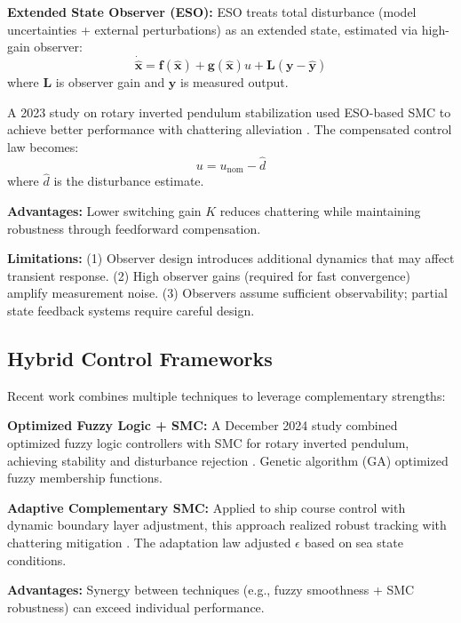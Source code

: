 \textbf{Extended State Observer (ESO):} ESO treats total disturbance (model uncertainties + external perturbations) as an extended state, estimated via high-gain observer:
\begin{equation}
\dot{\hat{\mathbf{x}}} = \mathbf{f}(\hat{\mathbf{x}}) + \mathbf{g}(\hat{\mathbf{x}}) u + \mathbf{L}(\mathbf{y} - \hat{\mathbf{y}})
\label{eq:eso}
\end{equation}
where $\mathbf{L}$ is observer gain and $\mathbf{y}$ is measured output.

A 2023 study on rotary inverted pendulum stabilization used ESO-based SMC to achieve better performance with chattering alleviation \cite{observer2023rotary}. The compensated control law becomes:
\begin{equation}
u = u_{\text{nom}} - \hat{d}
\label{eq:observer_compensation}
\end{equation}
where $\hat{d}$ is the disturbance estimate.

\textbf{Advantages:} Lower switching gain $K$ reduces chattering while maintaining robustness through feedforward compensation.

\textbf{Limitations:} (1) Observer design introduces additional dynamics that may affect transient response. (2) High observer gains (required for fast convergence) amplify measurement noise. (3) Observers assume sufficient observability; partial state feedback systems require careful design.

\subsection{Hybrid Control Frameworks}

Recent work combines multiple techniques to leverage complementary strengths:

\textbf{Optimized Fuzzy Logic + SMC:} A December 2024 study combined optimized fuzzy logic controllers with SMC for rotary inverted pendulum, achieving stability and disturbance rejection \cite{scirep2024fuzzy}. Genetic algorithm (GA) optimized fuzzy membership functions.

\textbf{Adaptive Complementary SMC:} Applied to ship course control with dynamic boundary layer adjustment, this approach realized robust tracking with chattering mitigation \cite{ship2024adaptive}. The adaptation law adjusted $\epsilon$ based on sea state conditions.

\textbf{Advantages:} Synergy between techniques (e.g., fuzzy smoothness + SMC robustness) can exceed individual performance.

